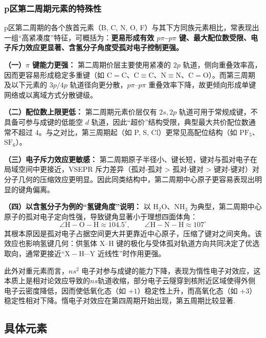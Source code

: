 \documentclass[UTF8]{ctexbook}
\begin{document}
\subsubsection{p区第二周期元素的特殊性}

p区第二周期的各个族首元素（B, C, N, O, F）与其下方同族元素相比，常表现出一组“高紧凑度”特征，可概括为：\textbf{更易形成有效 $p\pi$--$p\pi$ 键、最大配位数受限、电子斥力效应更显著、含氢分子角度受孤对电子控制更强。}

\textbf{（一）$\pi$ 键能力更强：}
第二周期价层主要使用紧凑的 $2p$ 轨道，侧向重叠效率高，因而更容易形成稳定多重键（如 $\mathrm{C{=}C}$、$\mathrm{C\equiv C}$、$\mathrm{N\equiv N}$、$\mathrm{C{=}O}$）。而第三周期及以下元素的 $3p/4p$ 轨道径向更分散，$p\pi$--$p\pi$ 重叠效率下降，故更倾向形成单键网络或以离域方式分散键级。

\textbf{（二）配位数上限更低：}
第二周期元素价层仅有 $2s,2p$ 轨道可用于常规成键，不具备可参与成键的低能空 $d$ 轨道，因此“超价”结构受限，典型最大共价配位数通常不超过 4。与之对比，第三周期起（如 P, S, Cl）更常见高配位结构（如 $\mathrm{PF_5}$、$\mathrm{SF_6}$）。

\textbf{（三）电子斥力效应更敏感：}
第二周期原子半径小、键长短，键对与孤对电子在局域空间中更接近，VSEPR 斥力差异（孤对-孤对 > 孤对-键对 > 键对-键对）对分子几何的压缩效应更明显。因此同类结构中，第二周期中心原子更容易表现出明显的键角偏离。

\textbf{（四）以含氢分子为例的“氢键角度”说明：}
以 $\mathrm{H_2O}$、$\mathrm{NH_3}$ 为典型，第二周期中心原子的孤对电子定向性强，导致键角显著小于理想四面体角：
\[
\angle \mathrm{H{-}O{-}H} \approx 104.5^{\circ},\qquad
\angle \mathrm{H{-}N{-}H} \approx 107^{\circ}
\]
其根本原因是孤对电子占据空间更大并更靠近中心原子，压缩了键对之间夹角。该效应也影响氢键几何：供氢体 X--H 键的极化与受体孤对轨道方向共同决定了优选取向，通常更接近“$\mathrm{X{-}H\cdots Y}$ 近线性”时作用更强。

此外对重元素而言，$ns^2$ 电子对参与成键的能力下降，表现为惰性电子对效应，这本质上是相对论效应导致的$ns$轨道收缩，部分电子云隧穿到核附近区域使得外侧电子云密度降低，因而使低氧化态（如 $+1$）稳定性上升，而高氧化态（如 $+3$）稳定性相对下降。惰电子对效应在第四周期开始出现，第五周期比较显著.

\newpage



\subsection{具体元素}
\end{document}
